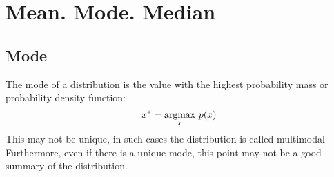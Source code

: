 \section{Mean. Mode. Median}

\subsection*{Mode}
The mode of a distribution is the value with the highest probability mass or probability density function:
\[
    x^* = \mbox{$\underset{x}{\operatorname{argmax}}\ p(x)$}
\]
This may not be unique, in such cases the distribution is called multimodal Furthermore, even if there is a unique mode, this point may not be a good summary of the distribution.